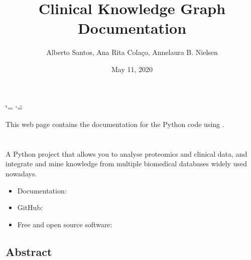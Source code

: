 \documentclass[letterpaper,10pt,english]{sphinxmanual}
\title{Clinical Knowledge Graph Documentation}
\date{May 11, 2020}
\author{Alberto Santos, Ana Rita Colaço, Annelaura B. Nielsen}
\begin{document}
\ifdefined\shorthandoff
  \ifnum\catcode`\=\string=\active\shorthandoff{=}\fi
  \ifnum\catcode`\"=\active{}\fi
\fi

\pagestyle{empty}
\sphinxmaketitle
\pagestyle{plain}
\sphinxtableofcontents
\pagestyle{normal}
\label{\detokenize{index::doc}}


This web page contains the documentation for the Python code using .



\chapter{}
\label{\detokenize{INTRO:clinical-knowledge-graph}}\label{\detokenize{INTRO::doc}}
 

A Python project that allows you to analyse proteomics and clinical data, and integrate and mine knowledge from multiple biomedical databases widely used nowadays.
\begin{itemize}
\item {} 
Documentation: 

\item {} 
GitHub: 

\item {} 
Free and open source software: 

\end{itemize}


\section{Abstract}
\label{\detokenize{INTRO:abstract}}
\end{document}
